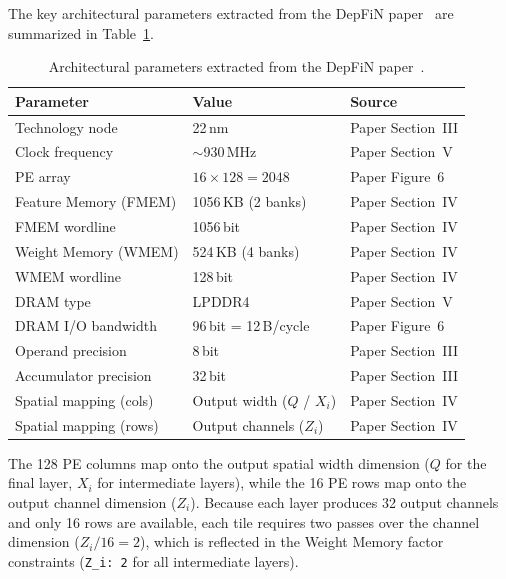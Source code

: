The key architectural parameters extracted from the DepFiN
paper~\cite{goetschalckx2023depfin} are summarized in
Table~\ref{tab:depfin-extracted-params}.

\begin{table}[htbp]
  \centering
  \caption{Architectural parameters extracted from the DepFiN
           paper~\cite{goetschalckx2023depfin}.}
  \label{tab:depfin-extracted-params}
  \small
  \begin{tabular}{l l l}
    \toprule
    \textbf{Parameter} & \textbf{Value} & \textbf{Source} \\
    \midrule
    Technology node         & 22\,nm                 & Paper Section~III \\
    Clock frequency         & $\sim$930\,MHz         & Paper Section~V \\
    PE array                & $16 \times 128 = 2048$ & Paper Figure~6 \\
    Feature Memory (FMEM)   & 1056\,KB (2 banks)     & Paper Section~IV \\
    FMEM wordline           & 1056\,bit              & Paper Section~IV \\
    Weight Memory (WMEM)    & 524\,KB (4 banks)      & Paper Section~IV \\
    WMEM wordline           & 128\,bit               & Paper Section~IV \\
    DRAM type               & LPDDR4                 & Paper Section~V \\
    DRAM I/O bandwidth      & 96\,bit = 12\,B/cycle  & Paper Figure~6 \\
    Operand precision       & 8\,bit                 & Paper Section~III \\
    Accumulator precision   & 32\,bit                & Paper Section~III \\
    Spatial mapping (cols)  & Output width ($Q$ / $X_i$) & Paper Section~IV \\
    Spatial mapping (rows)  & Output channels ($Z_i$)    & Paper Section~IV \\
    \bottomrule
  \end{tabular}
\end{table}

The 128 PE columns map onto the output spatial width dimension ($Q$ for
the final layer, $X_i$ for intermediate layers), while the 16 PE rows
map onto the output channel dimension ($Z_i$).
Because each layer produces 32 output channels and only 16 rows are
available, each tile requires two passes over the channel dimension
($Z_i/16 = 2$), which is reflected in the Weight Memory factor
constraints (\texttt{Z\_i: 2} for all intermediate layers).


